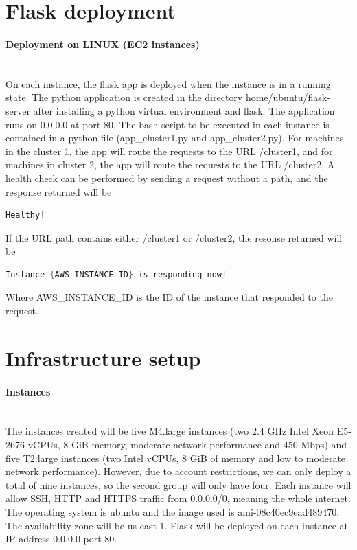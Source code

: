 \documentclass[11pt]{article}
\title{}
\author{}
\date{}
\begin{document}
\maketitle
\section{Flask deployment}

\paragraph{Deployment on LINUX (EC2 instances)}\mbox{}\\
On each instance, the flask app is deployed when the instance is in a running state. The python application is created in the directory home/ubuntu/flask-server after installing a python virtual environment and flask. The application runs on 0.0.0.0 at port 80. The bash script to be executed in each instance is contained in a python file (app\_cluster1.py and app\_cluster2.py). For machines in the cluster 1, the app will route the requests to the URL /cluster1, and for machines in cluster 2, the app will route the requests to the URL /cluster2. A health check can be performed by sending a request without a path, and the response returned will be
\begin{lstlisting}[language=C]
Healthy!
\end{lstlisting}
If the URL path contains either /cluster1 or /cluster2, the resonse returned will be
\begin{lstlisting}[language=C]
Instance {AWS_INSTANCE_ID} is responding now!
\end{lstlisting}
Where AWS\_INSTANCE\_ID is the ID of the instance that responded to the request.

\section{Infrastructure setup}

\paragraph{Instances}\mbox{}\\
The instances created will be five M4.large instances (two 2.4 GHz Intel Xeon E5-2676 vCPUs, 8 GiB memory, moderate network performance and 450 Mbps) and five T2.large instances (two Intel vCPUs, 8 GiB of memory and low to moderate network performance). However, due to account restrictions, we can only deploy a total of nine instances, so the second group will only have four. Each instance will allow SSH, HTTP and HTTPS traffic from 0.0.0.0/0, meaning the whole internet. The operating system is ubuntu and the image used is ami-08c40ec9ead489470. The availability zone will be us-east-1. Flask will be deployed on each instance at IP address 0.0.0.0 port 80.
\end{document}
